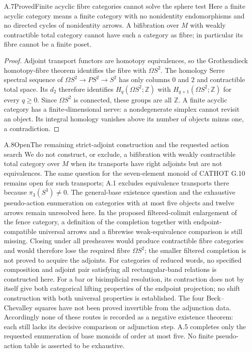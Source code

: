 \begin{result}{A.7}{Proved}{Finite acyclic fibre categories cannot solve the sphere test}
Here a finite acyclic category means a finite category with no nonidentity endomorphisms and no directed cycles of nonidentity arrows. A bifibration over $M$ with weakly contractible total category cannot have such a category as fibre; in particular its fibre cannot be a finite poset.
\end{result}
\begin{proof}
Adjoint transport functors are homotopy equivalences, so the Grothendieck homotopy-fibre theorem identifies the fibre with $\Omega S^2$. The homology Serre spectral sequence of $\Omega S^2\to PS^2\to S^2$ has only columns $0$ and $2$ and contractible total space. Its $d_2$ therefore identifies $H_q(\Omega S^2;\mathbb Z)$ with $H_{q+1}(\Omega S^2;\mathbb Z)$ for every $q\geq0$. Since $\Omega S^2$ is connected, these groups are all $\mathbb Z$. A finite acyclic category has a finite-dimensional nerve: a nondegenerate simplex cannot revisit an object. Its integral homology vanishes above its number of objects minus one, a contradiction.
\end{proof}

\begin{result}{A.8}{Open}{The remaining strict-adjoint construction and the requested action search}
We do not construct, or exclude, a bifibration with weakly contractible total category over $M$ when its transports have right adjoints but are not equivalences. The same question for the seven-element monoid of CATHOT G.10 remains open for such transports; A.1 excludes equivalence transports there because $\pi_3(S^3)\ne0$. The general-base existence question and the exhaustive pseudo-action enumeration on categories with at most five objects and twelve arrows remain unresolved here. In the proposed filtered-colimit enlargement of the fence category, a definition of the completion together with endpoint-compatible universal arrows and a fibrewise weak-equivalence comparison is still missing. Closing under all presheaves would produce contractible fibre categories and would therefore lose the required fibre $\Omega S^2$; the smaller filtered completion is not proved to acquire the adjoints. For categories of reduced words, no specified composition and adjoint pair satisfying all rectangular-band relations is constructed here. For a bar or bisimplicial resolution, its contraction does not by itself give both categorical lifting properties of the endpoint projection; no shift construction with both universal properties is established. The four Beck--Chevalley squares have not been proved invertible from the adjunction data. Accordingly none of these routes is recorded as a negative existence theorem: each still lacks its decisive comparison or adjunction step. A.5 completes only the requested enumeration of base monoids of order at most five. No finite pseudo-action table is asserted to be exhaustive.
\end{result}
